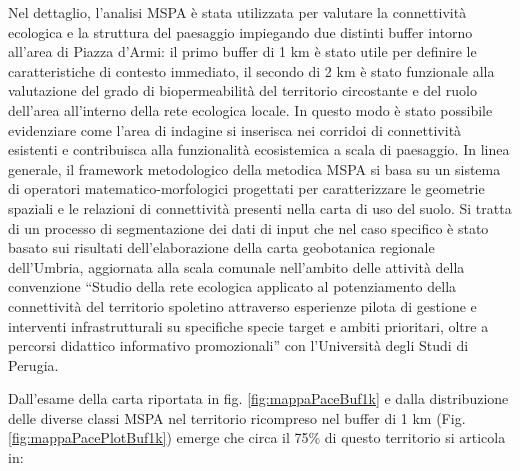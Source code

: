 \documentclass[
  a4paper,
]{book}
\begin{document}
Nel dettaglio, l'analisi MSPA è stata utilizzata per valutare la connettività ecologica e la struttura del paesaggio impiegando due distinti buffer intorno all'area di Piazza d'Armi: il primo buffer di 1 km è stato utile per definire le caratteristiche di contesto immediato, il secondo di 2 km è stato funzionale alla valutazione del grado di biopermeabilità del territorio circostante e del ruolo dell'area all'interno della rete ecologica locale.
In questo modo è stato possibile evidenziare come l'area di indagine si inserisca nei corridoi di connettività esistenti e contribuisca alla funzionalità ecosistemica a scala di paesaggio.
In linea generale, il framework metodologico della metodica MSPA si basa su un sistema di operatori matematico-morfologici progettati per caratterizzare le geometrie spaziali e le relazioni di connettività presenti nella carta di uso del suolo.
Si tratta di un processo di segmentazione dei dati di input che nel caso specifico è stato basato sui risultati dell'elaborazione della carta geobotanica regionale dell'Umbria, aggiornata alla scala comunale nell'ambito delle attività della convenzione ``Studio della rete ecologica applicato al potenziamento della connettività del territorio spoletino attraverso esperienze pilota di gestione e interventi infrastrutturali su specifiche specie target e ambiti prioritari, oltre a percorsi didattico informativo promozionali'' con l'Università degli Studi di Perugia.

Dall'esame della carta riportata in fig.
\ref{fig:mappaPaceBuf1k} e dalla distribuzione delle diverse classi MSPA nel territorio ricompreso nel buffer di 1 km (Fig. \ref{fig:mappaPacePlotBuf1k}) emerge che circa il 75\% di questo territorio si articola in:
\end{document}
